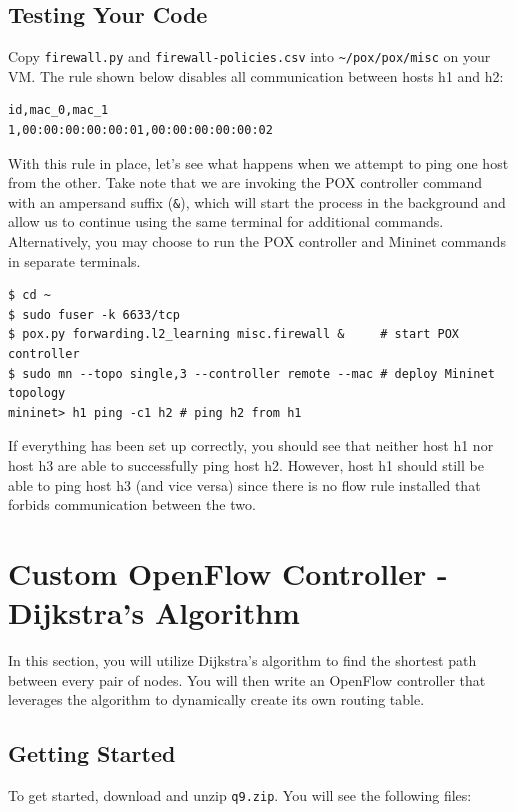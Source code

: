 \documentclass{article}
\begin{document}
\subsection{Testing Your Code}
Copy \texttt{firewall.py} and \texttt{firewall-policies.csv} into \nolinkurl{~/pox/pox/misc} on your VM.
The rule shown below disables all communication between hosts h1 and h2:
\begin{topbot}
\begin{verbatim}
id,mac_0,mac_1
1,00:00:00:00:00:01,00:00:00:00:00:02
\end{verbatim}
\end{topbot}

\noindent
With this rule in place, let's see what happens when we attempt to ping one host from the other.
Take note that we are invoking the POX controller command with an ampersand suffix (\texttt{\&}), which will start the process in the background and allow us to continue using the same terminal for additional commands.
Alternatively, you may choose to run the POX controller and Mininet commands in separate terminals.

\begin{topbot}
\begin{verbatim}
$ cd ~
$ sudo fuser -k 6633/tcp
$ pox.py forwarding.l2_learning misc.firewall &     # start POX controller
$ sudo mn --topo single,3 --controller remote --mac # deploy Mininet topology
mininet> h1 ping -c1 h2 # ping h2 from h1
\end{verbatim}
\end{topbot}

If everything has been set up correctly, you should see that neither host h1 nor host h3 are able to successfully ping host h2.
However, host h1 should still be able to ping host h3 (and vice versa) since there is no flow rule installed that forbids communication between the two.

\section{Custom OpenFlow Controller - Dijkstra's Algorithm}
In this section, you will utilize Dijkstra's algorithm to find the shortest path between every pair of nodes.
You will then write an OpenFlow controller that leverages the algorithm to dynamically create its own routing table.

\subsection{Getting Started}
To get started, download and unzip \texttt{q9.zip}.
You will see the following files:
\end{document}
